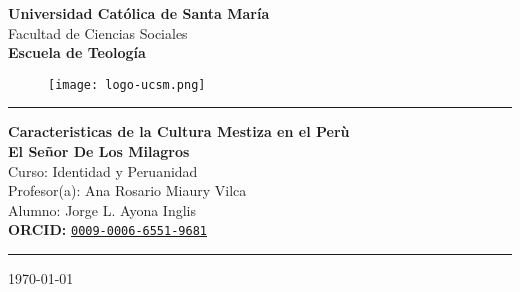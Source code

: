 \begin{titlepage}
	
	\begin{center}
		\huge \textbf{Universidad Católica de Santa María}\\[1cm]
		
		\large Facultad de Ciencias Sociales\\[3mm]
		\textbf{Escuela de Teología}\\[3mm]
		
		\begin{figure}[h]
			\centering
			\texttt{[image: logo-ucsm.png]} %
		\end{figure}		
		\vspace{3mm}
		
		\textcolor{verdelimon} {\rule{\linewidth}{0.5mm}}	
		
		\vspace{4mm}
		{\Large\textbf{Caracteristicas de la Cultura  Mestiza en el Perù}}\\[3mm]
		{\LARGE\textbf{El Señor De Los Milagros}}\\[5mm]
		
		\large{Curso: Identidad y Peruanidad}\\[2mm]
		\large{Profesor(a): Ana Rosario Miaury Vilca}\\[2mm]
		\large{Alumno: Jorge L. Ayona Inglis}\\[2mm]
		
		\large{\textbf{ORCID:} \href{https://orcid.org/0009-0006-6551-9681}{\texttt{0009-0006-6551-9681}}}\\[3mm]
		
		\textcolor{verdelimon}{\rule{\linewidth}{0.5mm}}	
		\vspace{0.5cm}
		
		{\large \today}
		
	\end{center}
	
\end{titlepage}
